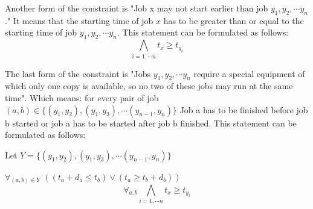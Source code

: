 \documentclass[12pt]{article}
\begin{document}
Another form of the constraint is "Job x may not start earlier than job $y_1, y_2, \cdots y_n$." It means that the starting time of job $x$ has to be greater than or equal to the starting time of job $y_1, y_2, \cdots y_n$. This statement can be formulated as follows:
\[ \bigwedge_{i=1,\cdots n} t_x \geq t_{y_i} \]

The last form of the constraint is "Jobs $y_1, y_2, \cdots y_n$ require a special equipment of which only one copy is available, so no two of these jobs may run at the same time". Which means: for every pair of job $(a,b) \in \{(y_1, y_2), (y_1, y_3), \cdots (y_{n-1}, y_{n})\}$ Job a has to be finished before job b started or job a has to be started after job b finished. This statement can be formulated as follows:

Let $Y=\{(y_1, y_2), (y_1, y_3), \cdots (y_{n-1}, y_{n})\}$

   {\Large $\forall_{(a,b) \in Y}$} $((t_a + d_a \leq t_b) \vee (t_a \geq t_b+d_b) )$
   \[ \forall_{a,b}\bigwedge_{i=1,\cdots n} t_x \geq t_{y_i} \]
\end{document}
